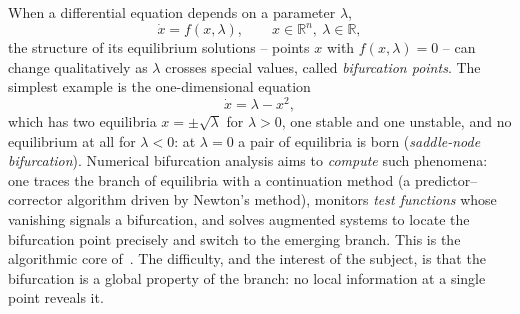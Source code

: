 \documentclass[11pt]{article}
\def\R{\mathbb{R}}
\begin{document}
When a differential equation depends on a parameter $\lambda$,
\begin{equation}\label{eq:param}
  \dot x = f(x,\lambda),
  \qquad x\in\R^n,\ \lambda\in\R,
\end{equation}
the structure of its equilibrium solutions -- points $x$ with
$f(x,\lambda)=0$ -- can change qualitatively as $\lambda$
crosses special values, called \emph{bifurcation points}. The
simplest example is the one-dimensional equation
\begin{equation}\label{eq:saddle-node}
  \dot x = \lambda - x^2,
\end{equation}
which has two equilibria $x=\pm\sqrt{\lambda}$ for $\lambda>0$,
one stable and one unstable, and no equilibrium at all for
$\lambda<0$: at $\lambda=0$ a pair of equilibria is born
(\emph{saddle-node bifurcation}). Numerical bifurcation
analysis aims to \emph{compute} such phenomena: one traces the
branch of equilibria with a continuation method (a
predictor--corrector algorithm driven by Newton's method),
monitors \emph{test functions} whose vanishing signals a
bifurcation, and solves augmented systems to locate the
bifurcation point precisely and switch to the emerging branch.
This is the algorithmic core of~\cite{seydel2010}. The
difficulty, and the interest of the subject, is that the
bifurcation is a global property of the branch: no local
information at a single point reveals it.

\end{document}
